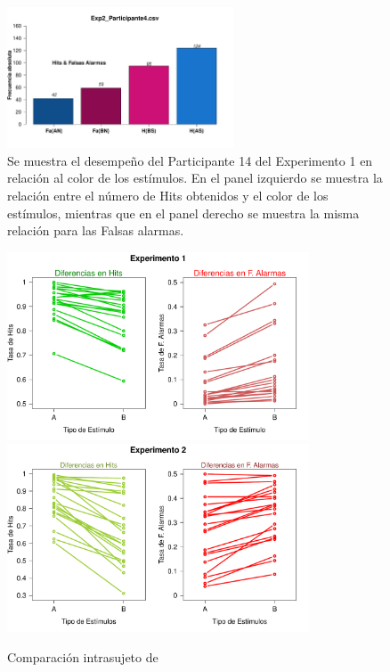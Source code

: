 \begin{figure}[th]
\centering
\includegraphics[width=0.60\textwidth]{Figures/MirrorRate_Exp2_P4}
\caption[Diferencias entre Hits y Falsas Alarmas por Condición; Ejemplo]{Se muestra el desempeño del Participante 14 del Experimento 1 en relación al color de los estímulos. En el panel izquierdo se muestra la relación entre el número de Hits obtenidos y el color de los estímulos, mientras que en el panel derecho se muestra la misma relación para las Falsas alarmas.}
\label{fig:MirrorRate_E2_P4}
\end{figure}




\begin{figure}[th]
\centering
\includegraphics[width=0.80\textwidth]{Figures/Diff_Rate_E1}\\ 
\includegraphics[width=0.80\textwidth]{Figures/Diff_Rate_E2}
\caption[Diferencias en Tasas (Evaluando diferencias en el desempeño entre las condiciones)]{Comparación intrasujeto de}
\label{fig:Diff_Rate}
\end{figure}


